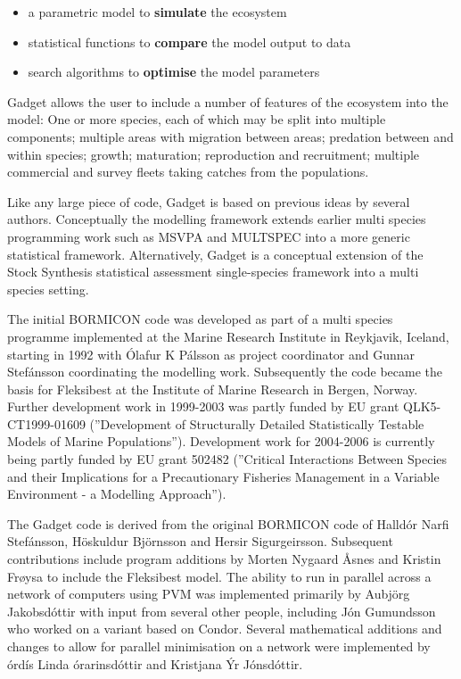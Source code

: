 \documentclass[10pt,twoside]{book}
\begin{document}
\begin{itemize}
\item a parametric model to {\bf simulate} the ecosystem
\item statistical functions to {\bf compare} the model output to data
\item search algorithms to {\bf optimise} the model parameters
\end{itemize}

Gadget allows the user to include a number of features of the ecosystem into the model: One or more species, each of which may be split into multiple components; multiple areas with migration between areas; predation between and within species; growth; maturation; reproduction and recruitment; multiple commercial and survey fleets taking catches from the populations.

\bigskip
Like any large piece of code, Gadget is based on previous ideas by several authors.  Conceptually the modelling framework extends earlier multi species programming work such as MSVPA and MULTSPEC into a more generic statistical framework.  Alternatively, Gadget is a conceptual extension of the Stock Synthesis statistical assessment single-species framework into a multi species setting.

\bigskip
The initial BORMICON code was developed as part of a multi species programme implemented at the Marine Research Institute in Reykjavik, Iceland, starting in 1992 with \'{O}lafur K P\'{a}lsson as project coordinator and Gunnar Stef\'{a}nsson coordinating the modelling work.  Subsequently the code became the basis for Fleksibest at the Institute of Marine Research in Bergen, Norway.  Further development work in 1999-2003 was partly funded by EU grant QLK5-CT1999-01609 (''Development of Structurally Detailed Statistically Testable Models of Marine Populations'').  Development work for 2004-2006 is currently being partly funded by EU grant 502482 (''Critical Interactions Between Species and their Implications for a Precautionary Fisheries Management in a Variable Environment - a Modelling Approach'').

\bigskip
The Gadget code is derived from the original BORMICON code of Halld\'{o}r Narfi Stef\'{a}nsson, H\"{o}skuldur Bj\"{o}rnsson and Hersir Sigurgeirsson.  Subsequent contributions include program additions by Morten Nygaard {\AA}snes and Kristin Fr{\o}ysa to include the Fleksibest model.  The ability to run in parallel across a network of computers using PVM was implemented primarily by Au{\dh}bj\"{o}rg Jakobsd\'{o}ttir with input from several other people, including J\'{o}n Gu{\dh}mundsson who worked on a variant based on Condor.  Several mathematical additions and changes to allow for parallel minimisation on a network were implemented by {\TH}\'{o}rd\'{i}s Linda {\TH}\'{o}rarinsd\'{o}ttir and Kristjana \'{Y}r J\'{o}nsd\'{o}ttir.
\end{document}
